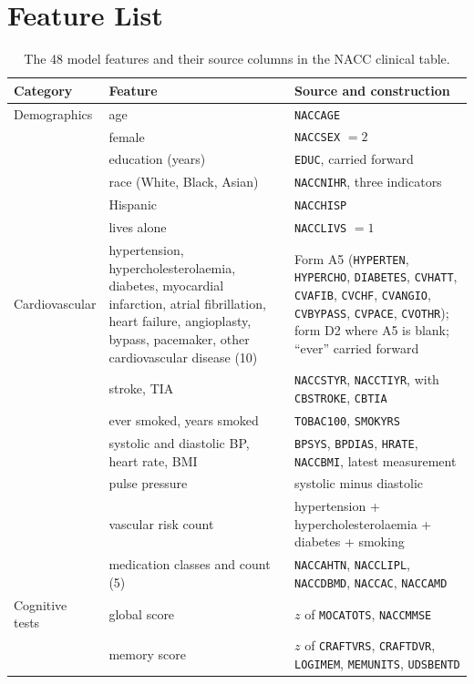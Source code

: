 \chapter{Feature List}
\label{app:features}

\begin{table}[H]
\centering\scriptsize
\caption{The 48 model features and their source columns in the NACC clinical table.}
\label{tab:featurelist}
\begin{tabularx}{\textwidth}{@{}lp{3.4cm}Y@{}}
\toprule
Category & Feature & Source and construction \\
\midrule
Demographics & age & \texttt{NACCAGE} \\
 & female & \texttt{NACCSEX} $= 2$ \\
 & education (years) & \texttt{EDUC}, carried forward \\
 & race (White, Black, Asian) & \texttt{NACCNIHR}, three indicators \\
 & Hispanic & \texttt{NACCHISP} \\
 & lives alone & \texttt{NACCLIVS} $= 1$ \\
\midrule
Cardiovascular & hypertension, hypercholesterolaemia, diabetes, myocardial infarction, atrial fibrillation, heart failure, angioplasty, bypass, pacemaker, other cardiovascular disease (10) & Form A5 (\texttt{HYPERTEN}, \texttt{HYPERCHO}, \texttt{DIABETES}, \texttt{CVHATT}, \texttt{CVAFIB}, \texttt{CVCHF}, \texttt{CVANGIO}, \texttt{CVBYPASS}, \texttt{CVPACE}, \texttt{CVOTHR}); form D2 where A5 is blank; ``ever'' carried forward \\
 & stroke, TIA & \texttt{NACCSTYR}, \texttt{NACCTIYR}, with \texttt{CBSTROKE}, \texttt{CBTIA} \\
 & ever smoked, years smoked & \texttt{TOBAC100}, \texttt{SMOKYRS} \\
 & systolic and diastolic BP, heart rate, BMI & \texttt{BPSYS}, \texttt{BPDIAS}, \texttt{HRATE}, \texttt{NACCBMI}, latest measurement \\
 & pulse pressure & systolic minus diastolic \\
 & vascular risk count & hypertension + hypercholesterolaemia + diabetes + smoking \\
 & medication classes and count (5) & \texttt{NACCAHTN}, \texttt{NACCLIPL}, \texttt{NACCDBMD}, \texttt{NACCAC}, \texttt{NACCAMD} \\
\midrule
Cognitive tests & global score & $z$ of \texttt{MOCATOTS}, \texttt{NACCMMSE} \\
 & memory score & $z$ of \texttt{CRAFTVRS}, \texttt{CRAFTDVR}, \texttt{LOGIMEM}, \texttt{MEMUNITS}, \texttt{UDSBENTD} \\

\end{tabularx}
\end{table}
